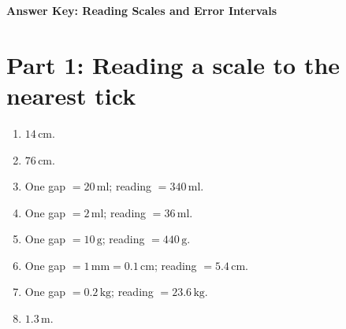 \documentclass[11pt,a4paper]{article}
\begin{document}
\begin{center}
  {\Large\bfseries Answer Key: Reading Scales and Error Intervals}
\end{center}

\section*{Part 1: Reading a scale to the nearest tick}
\begin{enumerate}[label=\textbf{Q\arabic*.}, leftmargin=*, itemsep=2pt]
\item \(14\,\text{cm}\).
\item \(76\,\text{cm}\).
\item One gap \(=20\,\text{ml}\); reading \(=340\,\text{ml}\).
\item One gap \(=2\,\text{ml}\); reading \(=36\,\text{ml}\).
\item One gap \(=10\,\text{g}\); reading \(=440\,\text{g}\).
\item One gap \(=1\,\text{mm}=0.1\,\text{cm}\); reading \(=5.4\,\text{cm}\).
\item One gap \(=0.2\,\text{kg}\); reading \(=23.6\,\text{kg}\).
\item \(1.3\,\text{m}\).
\end{enumerate}
\end{document}
